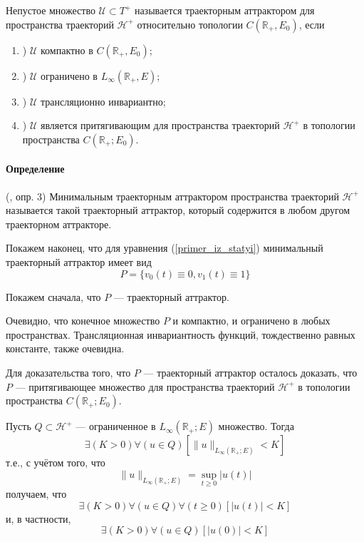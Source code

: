 Непустое множество $\mathcal{U}\subset T^+$
называется траекторным аттрактором для пространства траекторий $\mathcal{H}^+$
относительно топологии $C(\mathbb{R}_+,E_0)$, если
\begin{enumerate}
	\item)
		$\mathcal{U}$ компактно в $C(\mathbb{R}_+,E_0)$;
	\item)
		$\mathcal{U}$ ограничено в $L_{\infty}(\mathbb{R}_+,E)$;
	\item)
		$\mathcal{U}$ трансляционно инвариантно;
	\item)
		$\mathcal{U}$ является притягивающим для пространства траекторий $\mathcal{H}^+$
		в топологии пространства $C(\mathbb{R}_+; E_0)$.
\end{enumerate}

\paragraph{Определение} (\cite{zhidkosti_s_pamyatyu}, опр. 3)
Минимальным траекторным аттрактором пространства траекторий $\mathcal{H}^+$
называется такой траекторный аттрактор, который содержится в любом другом траекторном аттракторе.


Покажем наконец, что для уравнения (\ref{primer_iz_statyi}) минимальный траекторный аттрактор имеет вид
\begin{equation}
	P = \{ v_0(t) \equiv 0, v_1(t) \equiv 1\}
\end{equation}

Покажем сначала, что $P$ --- траекторный аттрактор.

Очевидно, что конечное множество $P$ и компактно, и ограничено в любых пространствах.
Трансляционная инвариантность функций, тождественно равных константе, также очевидна.

Для доказательства того, что $P$ --- траекторный аттрактор осталось доказать,
что $P$ --- притягивающее множество для пространства траекторий $\mathcal{H}^+$ в топологии пространства $C(\mathbb{R}_+; E_0)$.

Пусть $Q \subset \mathcal{H}^+$ --- ограниченное в $L_{\infty}(\mathbb{R}_+;E)$ множество.
Тогда
\begin{equation}
	\exists(K>0)\forall(u\in Q)\left[ \| u \|_{L_{\infty}(\mathbb{R}_+;E)} < K\right]
\end{equation}
т.е., с учётом того, что
$$
	\| u \|_{L_{\infty}(\mathbb{R}_+;E)} = \sup_{t\geq 0}|u(t)|
$$
получаем, что
\begin{equation}
	\exists(K>0)\forall(u\in Q)\forall(t \geq 0)\left[ | u (t) | < K\right]
\end{equation}
и, в частности,
\begin{equation}
	\exists(K>0)\forall(u\in Q)\left[ | u (0) | < K\right]
\end{equation}

